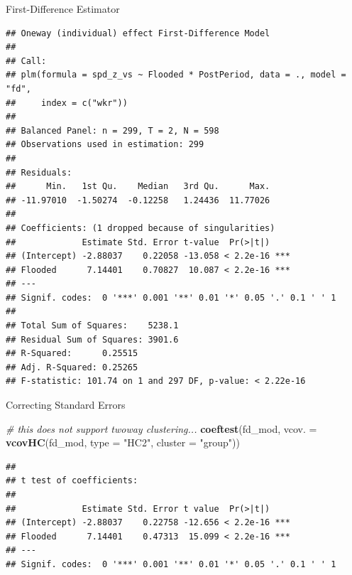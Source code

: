 \documentclass[ignorenonframetext,]{beamer}
\newenvironment{Shaded}{\begin{snugshade}}{\end{snugshade}}
\newcommand{\KeywordTok}[1]{\textcolor[rgb]{0.13,0.29,0.53}{\textbf{#1}}}
\newcommand{\DataTypeTok}[1]{\textcolor[rgb]{0.13,0.29,0.53}{#1}}
\newcommand{\StringTok}[1]{\textcolor[rgb]{0.31,0.60,0.02}{#1}}
\newcommand{\CommentTok}[1]{\textcolor[rgb]{0.56,0.35,0.01}{\textit{#1}}}
\newcommand{\NormalTok}[1]{#1}
\begin{document}
\begin{frame}[fragile]{First-Difference Estimator}

\tiny

\begin{verbatim}
## Oneway (individual) effect First-Difference Model
## 
## Call:
## plm(formula = spd_z_vs ~ Flooded * PostPeriod, data = ., model = "fd", 
##     index = c("wkr"))
## 
## Balanced Panel: n = 299, T = 2, N = 598
## Observations used in estimation: 299
## 
## Residuals:
##      Min.   1st Qu.    Median   3rd Qu.      Max. 
## -11.97010  -1.50274  -0.12258   1.24436  11.77026 
## 
## Coefficients: (1 dropped because of singularities)
##             Estimate Std. Error t-value  Pr(>|t|)    
## (Intercept) -2.88037    0.22058 -13.058 < 2.2e-16 ***
## Flooded      7.14401    0.70827  10.087 < 2.2e-16 ***
## ---
## Signif. codes:  0 '***' 0.001 '**' 0.01 '*' 0.05 '.' 0.1 ' ' 1
## 
## Total Sum of Squares:    5238.1
## Residual Sum of Squares: 3901.6
## R-Squared:      0.25515
## Adj. R-Squared: 0.25265
## F-statistic: 101.74 on 1 and 297 DF, p-value: < 2.22e-16
\end{verbatim}

\normalsize

\end{frame}

\begin{frame}[fragile]{Correcting Standard Errors}

\begin{Shaded}
\begin{Highlighting}[]
\CommentTok{# this does not support twoway clustering... }
\KeywordTok{coeftest}\NormalTok{(fd_mod, }\DataTypeTok{vcov. =} \KeywordTok{vcovHC}\NormalTok{(fd_mod, }\DataTypeTok{type =} \StringTok{"HC2"}\NormalTok{, }
                                \DataTypeTok{cluster =} \StringTok{"group"}\NormalTok{))}
\end{Highlighting}
\end{Shaded}

\begin{verbatim}
## 
## t test of coefficients:
## 
##             Estimate Std. Error t value  Pr(>|t|)    
## (Intercept) -2.88037    0.22758 -12.656 < 2.2e-16 ***
## Flooded      7.14401    0.47313  15.099 < 2.2e-16 ***
## ---
## Signif. codes:  0 '***' 0.001 '**' 0.01 '*' 0.05 '.' 0.1 ' ' 1
\end{verbatim}

\end{frame}
\end{document}
